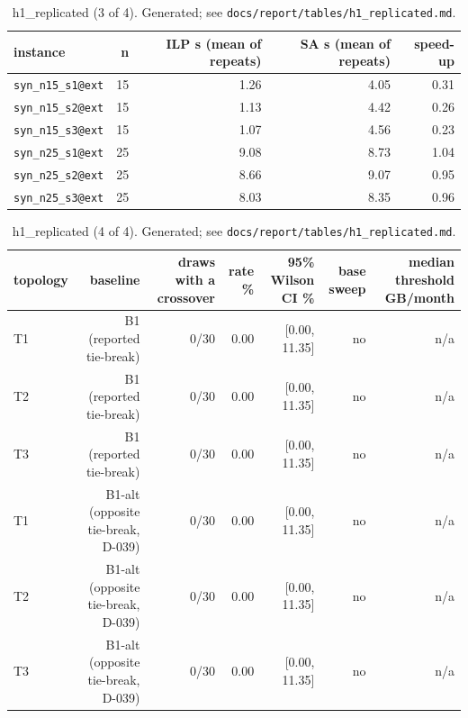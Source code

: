 \begin{table}[t]
\centering
\small
\begin{tabular}{lrrrr}
\toprule
instance & n & ILP s (mean of repeats) & SA s (mean of repeats) & speed-up \\
\midrule
\texttt{syn\_n15\_s1@ext} & 15 & 1.26 & 4.05 & 0.31 \\
\texttt{syn\_n15\_s2@ext} & 15 & 1.13 & 4.42 & 0.26 \\
\texttt{syn\_n15\_s3@ext} & 15 & 1.07 & 4.56 & 0.23 \\
\texttt{syn\_n25\_s1@ext} & 25 & 9.08 & 8.73 & 1.04 \\
\texttt{syn\_n25\_s2@ext} & 25 & 8.66 & 9.07 & 0.95 \\
\texttt{syn\_n25\_s3@ext} & 25 & 8.03 & 8.35 & 0.96 \\
\bottomrule
\end{tabular}
\caption{h1\_replicated (3 of 4). Generated; see \texttt{docs/report/tables/h1\_replicated.md}.}
\label{tab:h1_replicated-3}
\end{table}

\begin{table}[t]
\centering
\small
\begin{tabular}{lrrrrrr}
\toprule
topology & baseline & draws with a crossover & rate \% & 95\% Wilson CI \% & base sweep & median threshold GB/month \\
\midrule
T1 & B1 (reported tie-break) & 0/30 & 0.00 & [0.00, 11.35] & no & n/a \\
T2 & B1 (reported tie-break) & 0/30 & 0.00 & [0.00, 11.35] & no & n/a \\
T3 & B1 (reported tie-break) & 0/30 & 0.00 & [0.00, 11.35] & no & n/a \\
T1 & B1-alt (opposite tie-break, D-039) & 0/30 & 0.00 & [0.00, 11.35] & no & n/a \\
T2 & B1-alt (opposite tie-break, D-039) & 0/30 & 0.00 & [0.00, 11.35] & no & n/a \\
T3 & B1-alt (opposite tie-break, D-039) & 0/30 & 0.00 & [0.00, 11.35] & no & n/a \\
\bottomrule
\end{tabular}
\caption{h1\_replicated (4 of 4). Generated; see \texttt{docs/report/tables/h1\_replicated.md}.}
\label{tab:h1_replicated-4}
\end{table}
